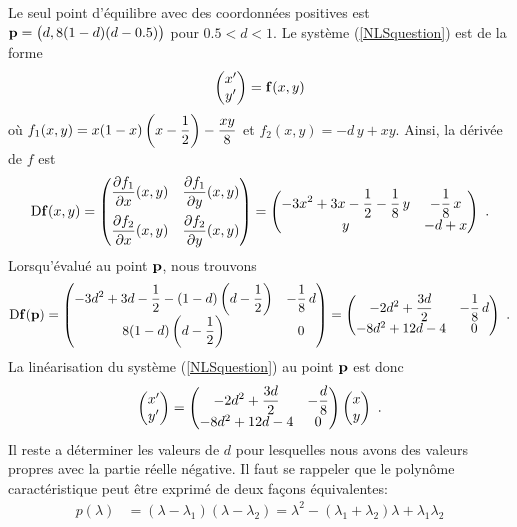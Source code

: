 { Le seul point d'équilibre avec des coordonnées positives est
$\mathbf{p} = \big(d, 8(1-d)(d-0.5) \big)$ pour $0.5<d<1$.
Le système (\ref{NLSquestion}) est de la forme
\[
  \begin{pmatrix}
   x ' \\ y'
  \end{pmatrix} = \mathbf{f}(x,y)
\]
où $\displaystyle f_1(x,y) = x(1-x)\left(x-\frac{1}{2}\right) - \frac{xy}{8}$
et $f_2(x,y) = -d\,y + xy$.  Ainsi, la dérivée de $f$ est
\[
\mathrm{D} \mathbf{f}(x,y) =
\begin{pmatrix}
\displaystyle \frac{\partial f_1}{\partial x}(x,y) & \displaystyle \frac{\partial f_1}{\partial y}(x,y) \\[1em]
\displaystyle \frac{\partial f_2}{\partial x}(x,y) & \displaystyle \frac{\partial f_2}{\partial y}(x,y)
\end{pmatrix}
= \begin{pmatrix}
\displaystyle -3x^2 + 3x - \frac{1}{2} - \frac{1}{8}\,y &
\displaystyle  -\frac{1}{8}\,x \\
y & -d+ x
\end{pmatrix} \ .
\]
Lorsqu'évalué au point $\mathbf{p}$, nous trouvons
\[
\mathrm{D} \mathbf{f}(\mathbf{p}) =
\begin{pmatrix}
\displaystyle -3d^2 + 3d - \frac{1}{2} - (1-d)\left(d-\frac{1}{2}\right) &
\displaystyle  -\frac{1}{8}\,d \\
\displaystyle 8(1-d)\left(d-\frac{1}{2}\right) & 0
\end{pmatrix}
= \begin{pmatrix}
\displaystyle -2d^2 + \frac{3d}{2}& \displaystyle -\frac{1}{8}\,d \\
-8d^2 +12d -4 & 0
\end{pmatrix} \ .
\]
La linéarisation du système (\ref{NLSquestion}) au point $\mathbf{p}$ est donc
\[
  \begin{pmatrix} x' \\ y' \end{pmatrix} =
  \begin{pmatrix}
\displaystyle -2d^2 +\frac{3 d}{2} & \displaystyle -\frac{d}{8} \\
-8d^2 +12d -4 & 0 \end{pmatrix}
\begin{pmatrix}
x \\ y
\end{pmatrix} \ .
\]
Il reste a déterminer les valeurs de $d$ pour lesquelles nous avons
des valeurs propres avec la partie réelle négative.  Il faut se
rappeler que le polynôme caractéristique peut être exprimé de deux
façons équivalentes:
\begin{align*}
p(\lambda) &= (\lambda - \lambda_1)(\lambda - \lambda_2)
= \lambda^2 - (\lambda_1+\lambda_2)\lambda + \lambda_1\lambda_2

\end{align*}}
